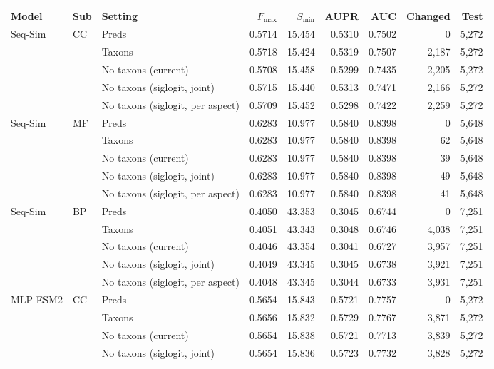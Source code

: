 \begin{tabular}{lllrrrrrr}
\toprule
Model & Sub & Setting & $F_{\max}$ & $S_{\min}$ & AUPR & AUC & Changed & Test \\
\midrule
Seq-Sim & CC & Preds & 0.5714 & 15.454 & 0.5310 & 0.7502 & 0 & 5{,}272 \\
 &  & Taxons & 0.5718 & 15.424 & 0.5319 & 0.7507 & 2{,}187 & 5{,}272 \\
 &  & No taxons (current) & 0.5708 & 15.458 & 0.5299 & 0.7435 & 2{,}205 & 5{,}272 \\
 &  & No taxons (siglogit, joint) & 0.5715 & 15.440 & 0.5313 & 0.7471 & 2{,}166 & 5{,}272 \\
 &  & No taxons (siglogit, per aspect) & 0.5709 & 15.452 & 0.5298 & 0.7422 & 2{,}259 & 5{,}272 \\
\addlinespace
Seq-Sim & MF & Preds & 0.6283 & 10.977 & 0.5840 & 0.8398 & 0 & 5{,}648 \\
 &  & Taxons & 0.6283 & 10.977 & 0.5840 & 0.8398 & 62 & 5{,}648 \\
 &  & No taxons (current) & 0.6283 & 10.977 & 0.5840 & 0.8398 & 39 & 5{,}648 \\
 &  & No taxons (siglogit, joint) & 0.6283 & 10.977 & 0.5840 & 0.8398 & 49 & 5{,}648 \\
 &  & No taxons (siglogit, per aspect) & 0.6283 & 10.977 & 0.5840 & 0.8398 & 41 & 5{,}648 \\
\addlinespace
Seq-Sim & BP & Preds & 0.4050 & 43.353 & 0.3045 & 0.6744 & 0 & 7{,}251 \\
 &  & Taxons & 0.4051 & 43.343 & 0.3048 & 0.6746 & 4{,}038 & 7{,}251 \\
 &  & No taxons (current) & 0.4046 & 43.354 & 0.3041 & 0.6727 & 3{,}957 & 7{,}251 \\
 &  & No taxons (siglogit, joint) & 0.4049 & 43.345 & 0.3045 & 0.6738 & 3{,}921 & 7{,}251 \\
 &  & No taxons (siglogit, per aspect) & 0.4048 & 43.345 & 0.3044 & 0.6733 & 3{,}931 & 7{,}251 \\
\midrule
MLP-ESM2 & CC & Preds & 0.5654 & 15.843 & 0.5721 & 0.7757 & 0 & 5{,}272 \\
 &  & Taxons & 0.5656 & 15.832 & 0.5729 & 0.7767 & 3{,}871 & 5{,}272 \\
 &  & No taxons (current) & 0.5654 & 15.838 & 0.5721 & 0.7713 & 3{,}839 & 5{,}272 \\
 &  & No taxons (siglogit, joint) & 0.5654 & 15.836 & 0.5723 & 0.7732 & 3{,}828 & 5{,}272 \\

\end{tabular}
